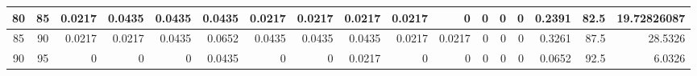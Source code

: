 \begin{table}[ht]
\begin{adjustbox}{width = \textwidth, center}
\begin{tabular}{|cc|r|r|r|r|r|r|r|r|r|r|r|r|r|r|r|}
            \cellcolor[HTML]{C8E4BE}80             & \cellcolor[HTML]{D9EAD3}85             & \cellcolor[HTML]{C7E9D8}0.0217                 & \cellcolor[HTML]{8FD2B1}0.0435                 & \cellcolor[HTML]{8FD2B1}0.0435                 & \cellcolor[HTML]{8FD2B1}0.0435                 & \cellcolor[HTML]{C7E9D8}0.0217                 & \cellcolor[HTML]{C7E9D8}0.0217                 & \cellcolor[HTML]{C7E9D8}0.0217                 & \cellcolor[HTML]{C7E9D8}0.0217                  & \cellcolor[HTML]{FFFFFF}0                       & \cellcolor[HTML]{FFFFFF}0                       & \cellcolor[HTML]{FFFFFF}0                       & \cellcolor[HTML]{FFFFFF}0                       & \cellcolor[HTML]{D9D2E9}0.2391                                                  & \cellcolor[HTML]{D9D2E9}82.5                                            & \cellcolor[HTML]{D9D2E9}19.72826087                                                              \\ \hline
            \cellcolor[HTML]{C8E4BE}85             & \cellcolor[HTML]{D9EAD3}90             & \cellcolor[HTML]{C7E9D8}0.0217                 & \cellcolor[HTML]{C7E9D8}0.0217                 & \cellcolor[HTML]{8FD2B1}0.0435                 & \cellcolor[HTML]{57BB8A}0.0652                 & \cellcolor[HTML]{8FD2B1}0.0435                 & \cellcolor[HTML]{8FD2B1}0.0435                 & \cellcolor[HTML]{8FD2B1}0.0435                 & \cellcolor[HTML]{C7E9D8}0.0217                  & \cellcolor[HTML]{C7E9D8}0.0217                  & \cellcolor[HTML]{FFFFFF}0                       & \cellcolor[HTML]{FFFFFF}0                       & \cellcolor[HTML]{FFFFFF}0                       & \cellcolor[HTML]{D9D2E9}0.3261                                                  & \cellcolor[HTML]{D9D2E9}87.5                                            & \cellcolor[HTML]{D9D2E9}28.5326                                                                  \\ \hline
            \rowcolor[HTML]{FFFFFF} 
            \cellcolor[HTML]{C8E4BE}90             & \cellcolor[HTML]{D9EAD3}95             & 0                                              & 0                                              & 0                                              & \cellcolor[HTML]{8FD2B1}0.0435                 & 0                                              & 0                                              & \cellcolor[HTML]{C7E9D8}0.0217                 & 0                                               & 0                                               & 0                                               & 0                                               & 0                                               & \cellcolor[HTML]{D9D2E9}0.0652                                                  & \cellcolor[HTML]{D9D2E9}92.5                                            & \cellcolor[HTML]{D9D2E9}6.0326                                                                   \\ \hline

\end{tabular}
\end{adjustbox}
\end{table}
